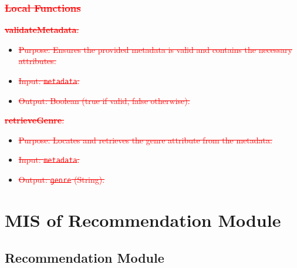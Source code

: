 \documentclass[12pt, titlepage]{article}
\begin{document}
\subsubsection{\textcolor{red}{\sout{Local Functions}}}

\textcolor{red}{\sout{\textbf{validateMetadata}:}}
\begin{itemize}
\item \textcolor{red}{\sout{Purpose: Ensures the provided metadata is valid and contains the necessary attributes.}}
\item \textcolor{red}{\sout{Input: \texttt{metadata}.}}
\item \textcolor{red}{\sout{Output: Boolean (true if valid, false otherwise).}}
\end{itemize}

\textcolor{red}{\sout{\textbf{retrieveGenre}:}}
\begin{itemize}
\item \textcolor{red}{\sout{Purpose: Locates and retrieves the genre attribute from the metadata.}}
\item \textcolor{red}{\sout{Input: \texttt{metadata}.}}
\item \textcolor{red}{\sout{Output: \texttt{genre} (String).}}
\end{itemize}

\section{MIS of Recommendation Module} 

\subsection{Recommendation Module}

\end{document}
